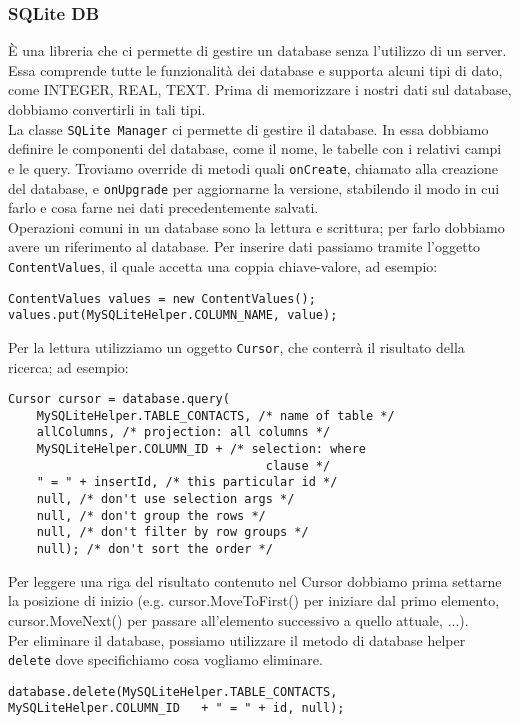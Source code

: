 \subsubsection{SQLite DB}
È una libreria che ci permette di gestire un database senza l'utilizzo di un
server. Essa comprende tutte le funzionalità dei database e supporta alcuni
tipi di dato, come INTEGER, REAL, TEXT. Prima di memorizzare i nostri dati sul
database, dobbiamo convertirli in tali tipi.\\
La classe \texttt{SQLite Manager} ci permette di gestire il database. In essa
dobbiamo definire le componenti del database, come il nome, le tabelle con i
relativi campi e le query. Troviamo override di metodi quali \texttt{onCreate},
chiamato alla creazione del database, e \texttt{onUpgrade} per aggiornarne la
versione, stabilendo il modo in cui farlo e cosa farne nei dati precedentemente
salvati.\\
Operazioni comuni in un database sono la lettura e scrittura; per farlo dobbiamo
avere un riferimento al database. Per inserire dati passiamo tramite l'oggetto
\texttt{ContentValues}, il quale accetta una coppia chiave-valore, ad esempio:
\begin{lstlisting}[frame=single]
ContentValues values = new ContentValues();
values.put(MySQLiteHelper.COLUMN_NAME, value);
\end{lstlisting}
Per la lettura utilizziamo un oggetto \texttt{Cursor}, che conterrà il risultato
della ricerca; ad esempio:
\begin{lstlisting}[frame=single]
Cursor cursor = database.query(
    MySQLiteHelper.TABLE_CONTACTS, /* name of table */
    allColumns, /* projection: all columns */
    MySQLiteHelper.COLUMN_ID + /* selection: where
                                    clause */
    " = " + insertId, /* this particular id */
    null, /* don't use selection args */
    null, /* don't group the rows */
    null, /* don't filter by row groups */
    null); /* don't sort the order */
\end{lstlisting}
Per leggere una riga del risultato contenuto nel Cursor dobbiamo prima settarne
la posizione di inizio (e.g. cursor.MoveToFirst() per iniziare dal primo
elemento, cursor.MoveNext() per passare all'elemento successivo a quello
attuale, ...).\\
Per eliminare il database, possiamo utilizzare il metodo di database helper
\texttt{delete} dove specifichiamo cosa vogliamo eliminare.
\begin{lstlisting}[frame=single]
database.delete(MySQLiteHelper.TABLE_CONTACTS,
MySQLiteHelper.COLUMN_ID   + " = " + id, null);
\end{lstlisting}
